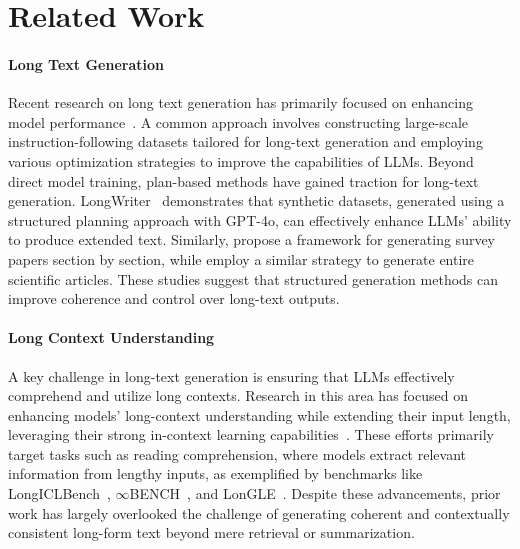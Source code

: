 \section{Related Work}
\paragraph{Long Text Generation}
Recent research on long text generation has primarily focused on enhancing model performance~\cite{pham2024suri,zhang2024longcite,bai2024longwriter,quan2024language,tang2024skyscript,quan2024automatically}. A common approach involves constructing large-scale instruction-following datasets tailored for long-text generation and employing various optimization strategies to improve the capabilities of LLMs. 
Beyond direct model training, plan-based methods have gained traction for long-text generation. LongWriter~\cite{bai2024longwriter} demonstrates that synthetic datasets, generated using a structured planning approach with GPT-4o, can effectively enhance LLMs' ability to produce extended text. Similarly, \citet{wang2024autosurvey} propose a framework for generating survey papers section by section, while \citet{lu2024ai} employ a similar strategy to generate entire scientific articles. 
These studies suggest that structured generation methods can improve coherence and control over long-text outputs.

\paragraph{Long Context Understanding}
A key challenge in long-text generation is ensuring that LLMs effectively comprehend and utilize long contexts. Research in this area has focused on enhancing models' long-context understanding while extending their input length, leveraging their strong in-context learning capabilities~\cite{chen2023longlora,jiang2023longllmlingua,li-etal-2023-compressing,jin2024llm,zhang2024pqcache,ding2024longrope}. These efforts primarily target tasks such as reading comprehension, where models extract relevant information from lengthy inputs, as exemplified by benchmarks like LongICLBench~\cite{li2024long}, $\infty$BENCH~\cite{zhang2024bench}, and LonGLE~\cite{li2023loogle}. Despite these advancements, prior work has largely overlooked the challenge of generating coherent and contextually consistent long-form text beyond mere retrieval or summarization.

